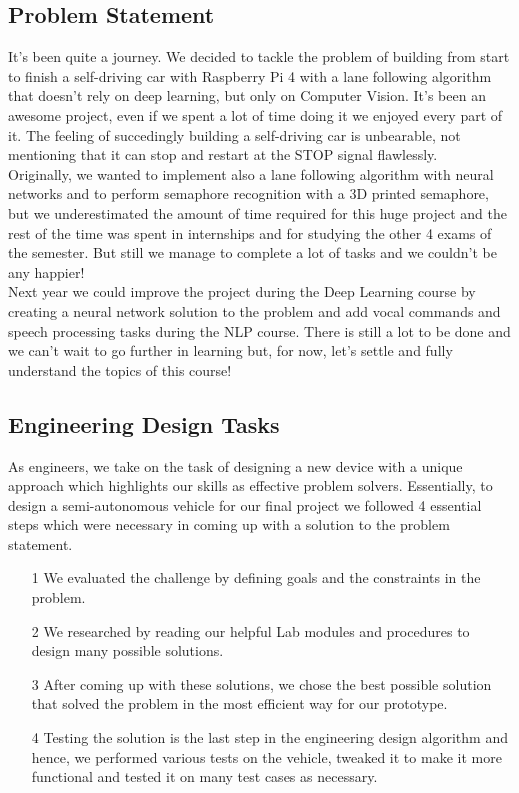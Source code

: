 \documentclass[12pt,a4paper]{article}
\begin{document}
\subsection{Problem Statement}
\begin{large}
It's been quite a journey. We decided to tackle the problem of building from start to finish a self-driving car with Raspberry Pi 4 with a lane following algorithm that doesn't rely on deep learning, but only on Computer Vision. It's been an awesome project, even if we spent a lot of time doing it we enjoyed every part of it. The feeling of succedingly building a self-driving car is unbearable, not mentioning that it can stop and restart at the STOP signal flawlessly. \\
Originally, we wanted to implement also a lane following algorithm with neural networks and to perform semaphore recognition with a 3D printed semaphore, but we underestimated the amount of time required for this huge project and the rest of the time was spent in internships and for studying the other 4 exams of the semester. But still we manage to complete a lot of tasks and we couldn't be any happier! \\
Next year we could improve the project during the Deep Learning course by creating a neural network solution to the problem and add vocal commands and speech processing tasks during the NLP course. There is still a lot to be done and we can't wait to go further in learning but, for now, let's settle and fully understand the topics of this course!
\subsection{Engineering Design Tasks}
As engineers, we take on the task of designing a new device with a unique approach which highlights our skills as effective problem solvers. Essentially, to design a semi-autonomous vehicle for our final project we followed 4 essential steps which were necessary in coming up with a solution to the problem statement. 

\begin{itemize}
\item[1] We evaluated the challenge by defining goals and the constraints in the problem.
\item[2] We researched by reading our helpful Lab modules and procedures to design many possible solutions.
\item[3] After coming up with these solutions, we chose the best possible solution that solved the problem in the most efficient way for our prototype.
\item[4] Testing the solution is the last step in the engineering design algorithm and hence, we performed various tests on the vehicle, tweaked it to make it more functional and tested it on many test cases as necessary. 
\end{itemize}



\end{large}
\end{document}
